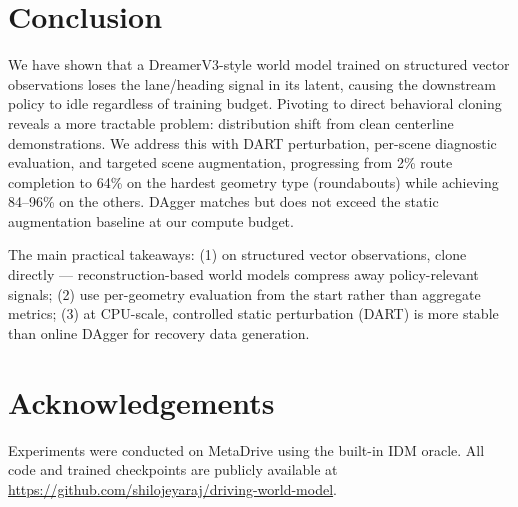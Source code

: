 \documentclass{article}
\begin{document}
\section{Conclusion}
\label{sec:conclusion}

We have shown that a DreamerV3-style world model trained on structured
vector observations loses the lane/heading signal in its latent, causing the
downstream policy to idle regardless of training budget. Pivoting to direct
behavioral cloning reveals a more tractable problem: distribution shift from
clean centerline demonstrations. We address this with DART perturbation,
per-scene diagnostic evaluation, and targeted scene augmentation, progressing
from 2\% route completion to 64\% on the hardest geometry type (roundabouts)
while achieving 84--96\% on the others. DAgger matches but does not exceed
the static augmentation baseline at our compute budget.

The main practical takeaways: (1) on structured vector observations, clone
directly --- reconstruction-based world models compress away policy-relevant
signals; (2) use per-geometry evaluation from the start rather than aggregate
metrics; (3) at CPU-scale, controlled static perturbation (DART) is more
stable than online DAgger for recovery data generation.

\section*{Acknowledgements}
Experiments were conducted on MetaDrive \citep{li2022metadrive} using the
built-in IDM oracle. All code and trained checkpoints are publicly available
at \url{https://github.com/shilojeyaraj/driving-world-model}.



\end{document}
